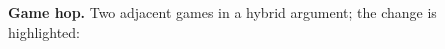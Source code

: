 \textbf{Game hop.}
Two adjacent games in a hybrid argument; the change is highlighted:

\begin{pchstack}[center]
\pchspace
{}
\end{pchstack}
